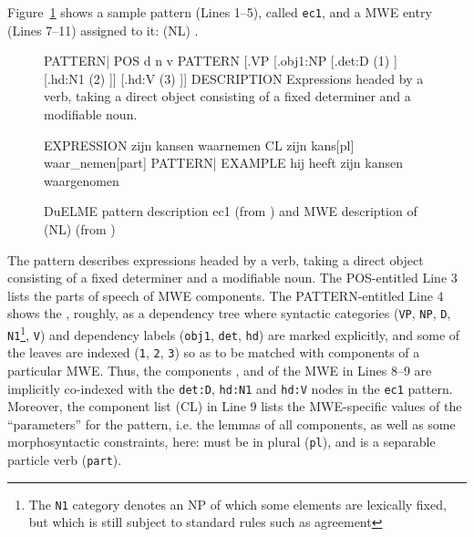 \documentclass[output=paper
,modfonts
,nonflat
,biblatexbackend=biber
]{langsci/langscibook}
\begin{document}
Figure~\ref{lic:fig:duelme} shows a sample pattern (Lines 1--5), called \texttt{ec1}, and a MWE entry (Lines 7--11) assigned to it: (NL) .
\begin{figure}[h]
\begin{duelme}
PATTERN|%
POS d n v
PATTERN  [.VP [.obj1:NP [.det:D (1) ] [.hd:N1 (2) ]] [.hd:V (3) ]]
DESCRIPTION Expressions headed by a verb, taking a direct object consisting of a fixed determiner and a modifiable noun.

EXPRESSION zijn kansen waarnemen
CL zijn kans[pl] waar_nemen[part]
PATTERN|%
EXAMPLE hij heeft zijn kansen waargenomen
\end{duelme}
  \caption{DuELME pattern description ec1 (from \citealt{gregoire:07}) and MWE description of (NL)  (from \citealt{gregoire:10})}
  \label{lic:fig:duelme}   
\end{figure}

The pattern describes expressions headed by a verb, taking a direct object consisting of a fixed determiner and a modifiable noun. The POS-entitled Line 3 lists the parts of speech of MWE components. The PATTERN-entitled Line 4 shows the , roughly, as a dependency tree where syntactic categories (\texttt{VP}, \texttt{NP}, \texttt{D}, \texttt{N1}\footnote{The \texttt{N1} category denotes an NP of which some elements are lexically fixed, but which is still subject to standard  rules such as agreement}, \texttt{V}) and dependency labels (\texttt{obj1}, \texttt{det}, \texttt{hd}) are marked explicitly, and some of the leaves are indexed (\texttt{1}, \texttt{2}, \texttt{3}) so as to be matched with components of a particular MWE. Thus, the components ,  and  of the MWE in Lines 8--9 are implicitly co-indexed with the \texttt{det:D}, \texttt{hd:N1} and \texttt{hd:V} nodes in the \texttt{ec1} pattern. Moreover, the component list (CL) in Line 9 lists the MWE-specific values of the ``parameters'' for the pattern, i.e. the lemmas of all components, as well as some morphosyntactic constraints, here:  must be in plural (\texttt{pl}), and  is a separable particle verb (\texttt{part}). 
\end{document}
